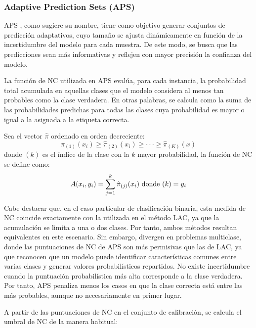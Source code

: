 
\subsubsection{Adaptive Prediction Sets (APS)}

\acrshort{APS} \cite{romano2020}, como sugiere su nombre, tiene como objetivo generar conjuntos de predicción adaptativos, cuyo tamaño se ajusta dinámicamente en función de la incertidumbre del modelo para cada muestra. De este modo, se busca que las predicciones sean más informativas y reflejen con mayor precisión la confianza del modelo.

La función de \acrshort{NC} utilizada en \acrshort{APS} evalúa, para cada instancia, la probabilidad total acumulada en aquellas clases que el modelo considera al menos tan probables como la clase verdadera. En otras palabras, se calcula como la suma de las probabilidades predichas para todas las clases cuya probabilidad es mayor o igual a la asignada a la etiqueta correcta.

Sea el vector $\hat{\pi}$ ordenado en orden decreciente: 
$$
\hat{\pi}_{(1)}(x_i) \ge \hat{\pi}_{(2)}(x_i) \ge \cdot\cdot\cdot \ge \hat{\pi}_{(K)}(x)
$$
donde $(k)$ es el índice de la clase con la $k$ mayor probabilidad, la función de \acrshort{NC} se define como:
$$
A(x_i, y_i) = \sum_{j=1}^k \hat{\pi}_{(j)}(x_i) \textnormal{ donde } (k)=y_i 
$$

Cabe destacar que, en el caso particular de clasificación binaria, esta medida de \acrshort{NC} coincide exactamente con la utilizada en el método \acrshort{LAC}, ya que la acumulación se limita a una o dos clases. Por tanto, ambos métodos resultan equivalentes en este escenario. Sin embargo, divergen en problemas multiclase, donde las puntuaciones de \acrshort{NC} de \acrshort{APS} son más permisivas que las de \acrshort{LAC}, ya que reconocen que un modelo puede identificar características comunes entre varias clases y generar valores probabilísticos repartidos. No existe incertidumbre cuando la puntuación probabilística más alta corresponde a la clase verdadera. Por tanto, \acrshort{APS} penaliza menos los casos en que la clase correcta está entre las más probables, aunque no necesariamente en primer lugar.

A partir de las puntuaciones de \acrshort{NC} en el conjunto de calibración, se calcula el umbral de \acrshort{NC} de la manera habitual:

